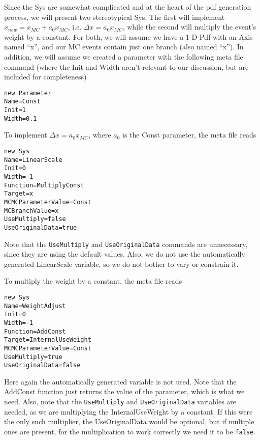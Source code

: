 Since the Sys are somewhat complicated and at the heart of the pdf
generation process, we will present two stereotypical Sys.  The first
will implement $x_{new} = x_{MC} + a_0 x_{MC}$, i.e. $\Delta x = a_0
x_{MC}$, while the second will multiply the event's weight by a
constant.  For both, we will assume we have a 1-D Pdf with an Axis
named ``x'', and our MC events contain just one branch (also named
``x'').  In addition, we will assume we created a parameter with the
following meta file command (where the Init and Width aren't relevant
to our discussion, but are included for completeness)
\begin{verbatim}
new Parameter
Name=Const
Init=1
Width=0.1
\end{verbatim}

To implement $\Delta x = a_0 x_{MC}$, where $a_0$ is the Const
parameter, the meta file reads
\begin{verbatim}
new Sys
Name=LinearScale
Init=0
Width=-1
Function=MultiplyConst
Target=x
MCMCParameterValue=Const
MCBranchValue=x
UseMultiply=false
UseOriginalData=true
\end{verbatim}
Note that the \verb|UseMultiply| and \verb|UseOriginalData| commands
are unnecessary, since they are using the default values.  Also, we do
not use the automatically generated LinearScale variable, so we do not
bother to vary or constrain it.

To multiply the weight by a constant, the meta file reads
\begin{verbatim}
new Sys
Name=WeightAdjust
Init=0
Width=-1
Function=AddConst
Target=InternalUseWeight
MCMCParameterValue=Const
UseMultiply=true
UseOriginalData=false
\end{verbatim}
Here again the automatically generated variable is not used.  Note
that the AddConst function just returns the value of the parameter,
which is what we need.  Also, note that the \verb|UseMultiply| and
\verb|UseOriginalData| variables are needed, as we are multiplying the
InternalUseWeight by a constant.  If this were the only such
multiplier, the UseOriginalData would be optional, but if multiple
ones are present, for the multiplication to work correctly we need it
to be \verb|false|.

